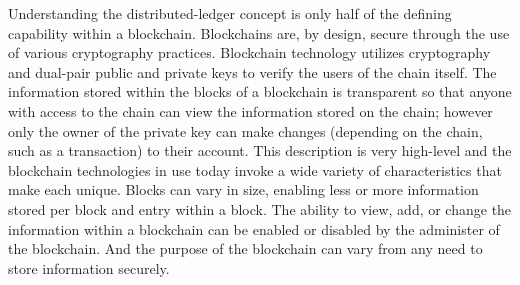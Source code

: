 Understanding the distributed-ledger concept is only half of the defining capability within a blockchain. Blockchains are, by design, secure through the use of various cryptography practices. Blockchain technology utilizes cryptography and dual-pair public and private keys to verify the users of the chain itself. The information stored within the blocks of a blockchain is transparent so that anyone with access to the chain can view the information stored on the chain; however only the owner of the private key can make changes (depending on the chain, such as a transaction) to their account. This description is very high-level and the blockchain technologies in use today invoke a wide variety of characteristics that make each unique. Blocks can vary in size, enabling less or more information stored per block and entry within a block. The ability to view, add, or change the information within a blockchain can be enabled or disabled by the administer of the blockchain. And the purpose of the blockchain can vary from any need to store information securely.

